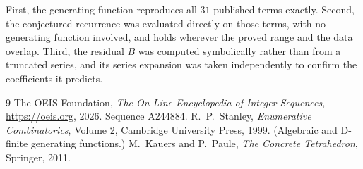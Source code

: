 \documentclass[11pt,a4paper]{article}
\theoremstyle{plain}
\theoremstyle{definition}
\begin{document}
First, the generating function reproduces all $31$ published terms exactly. Second,
the conjectured recurrence was evaluated directly on those terms, with no generating function
involved, and holds wherever the proved range and the data overlap. Third, the residual $B$ was
computed symbolically rather than from a truncated series, and its series expansion was taken
independently to confirm the coefficients it predicts.

\begin{thebibliography}{9}
 The OEIS Foundation, \emph{The On-Line Encyclopedia of Integer Sequences},
\url{https://oeis.org}, 2026. Sequence A244884.
 R.~P.~Stanley, \emph{Enumerative Combinatorics}, Volume 2, Cambridge
University Press, 1999. (Algebraic and D-finite generating functions.)
 M.~Kauers and P.~Paule, \emph{The Concrete Tetrahedron}, Springer, 2011.
\end{thebibliography}
\end{document}
